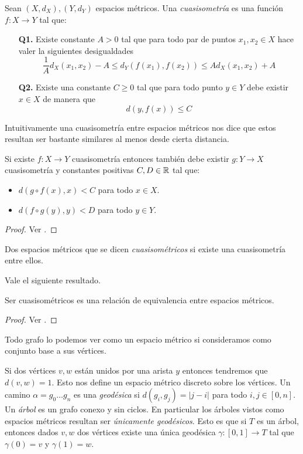 \documentclass[tesis.tex]{subfiles}
\begin{document}
\begin{deff}
	Sean $(X,d_X),(Y,d_Y)$ espacios métricos. 
	Una \emph{cuasisometría} es una función $f:X \to Y$ tal que:
	\begin{itemize}
		\item[\textbf{Q1.}] Existe constante $A > 0$ tal que para todo par de puntos $x_1,x_2 \in X$ hace valer la siguientes desigualdades
		\[
		\frac{1}{A} d_X(x_1,x_2) - A \le d_Y(f(x_1),f(x_2)) \le A d_X(x_1,x_2) + A
		\]
		\item[\textbf{Q2.}] Existe una constante $C \ge 0$ tal que para todo punto $y \in Y$ debe existir $x \in X$ de manera que 
		\[
		d(y,f(x)) \le C
		\]
	\end{itemize}
\end{deff}

Intuitivamente una cuasisometría entre espacios métricos nos dice que estos resultan ser bastante similares al menos desde cierta distancia. 
\medskip
\begin{prop}
	Si existe $f:X \to Y$ cuasisometría entonces también debe existir $g:Y \to X$ cuasisometría y constantes positivas $C,D \in \mathbb{R}$ tal que:
	\begin{itemize}
		\item $d(g \circ f (x), x) < C$ para todo $x \in X$.
		\item $d(f \circ g (y), y) < D$ para todo $y \in Y$. 
	\end{itemize}
\end{prop}
\begin{proof}
	Ver \cite{loh2017geometric}.
\end{proof}

\begin{deff}
	Dos espacios métricos que se dicen \emph{cuasisométricos} si existe una cuasisometría entre ellos.
\end{deff}

Vale el siguiente resultado.
\begin{prop}
	Ser cuasisométricos es una relación de equivalencia entre espacios métricos.
\end{prop}
\begin{proof}
	Ver \cite{loh2017geometric}.
\end{proof}



Todo grafo lo podemos ver como un espacio métrico si consideramos como conjunto base a sus vértices. 

Si dos vértices $v,w$ están unidos por una arista $y$ entonces tendremos que $d(v,w)=1$.
Esto nos define un espacio métrico discreto sobre los vértices. 
Un camino $\alpha = g_0 \dots g_n$ es una \emph{geodésica} si $d(g_i,g_j) = |j-i|$ para todo $i,j \in [0,n]$.
Un \emph{árbol} es un grafo conexo y sin ciclos. 
En particular los árboles vistos como espacios métricos resultan ser \emph{únicamente geodésicos}. 
Esto es que si $T$ es un árbol, entonces dados $v,w$ dos vértices existe una única geodésica $\gamma:[0,1] \to T$ tal que $\gamma(0)=v$ y $\gamma(1)=w$.
\end{document}

